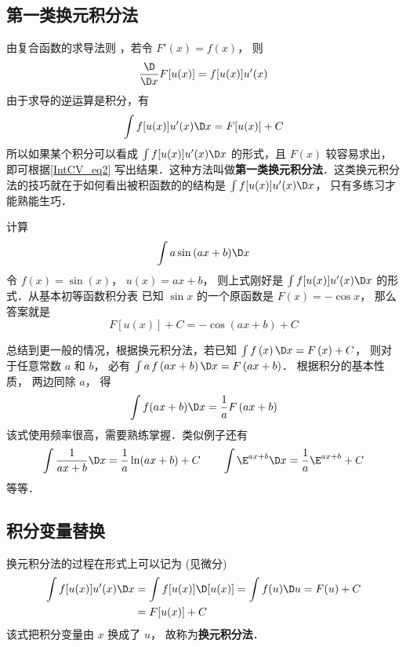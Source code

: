 
\subsection{第一类换元积分法}
由复合函数的求导法则%
，若令 $F'\left( x \right) = f\left( x \right)$， 则
\begin{equation}
\frac{\D}{\D x}	F[u(x)] = f[u(x)]u'(x)
\end{equation}
由于求导的逆运算是积分，有
\begin{equation}\label{IntCV_eq2}
\int f[u(x)]u'(x) \D x  = F[u(x)] + C
\end{equation}
所以如果某个积分可以看成 $\int f[u(x)]u'(x)\D x$ 的形式，且 $F(x)$ 较容易求出，即可根据\autoref{IntCV_eq2} 写出结果．这种方法叫做\textbf{第一类换元积分法}．这类换元积分法的技巧就在于如何看出被积函数的的结构是 $\int f[u(x)]u'(x)\D x$， 只有多练习才能熟能生巧． 

\begin{exam}{}
计算
\[\int {a\sin \left( {ax + b} \right)} \D x\]
令 $f\left( x \right) = \sin \left( x \right)$， $u\left( x \right) = ax + b$， 则上式刚好是 $\int f[u(x)]u'(x)\D x$ 的形式．从基本初等函数积分表 %
已知 $\sin x$ 的一个原函数是 $F(x) = -\cos x$， 那么答案就是
\begin{equation}
F[u(x)] + C =  - \cos \left( {ax + b} \right) + C
\end{equation}
\end{exam}

总结到更一般的情况，根据换元积分法，若已知 $\int {f\left( x \right)\D x}  = F\left( x \right) + C$， 则对于任意常数 $a$ 和 $b$， 必有 $\int {a\,f\left( {ax + b} \right)\D x}  = F\left( {ax + b} \right)$． 根据积分的基本性质，%
两边同除 $a$， 得
\begin{equation}
\int {f(ax + b) \D x}  = \frac{1}{a}F\left( {ax + b} \right)
\end{equation}
该式使用频率很高，需要熟练掌握．类似例子还有
\[ \int \frac{1}{ax+b}\D x = \frac{1}{a}\ln (ax + b)+C  \qquad
\int \E^{ax + b}\D x = \frac{1}{a}{\E^{ax + b}}+C \]
等等．

\subsection{积分变量替换}

换元积分法的过程在形式上可以记为 (见微分)
\begin{equation}\label{IntCV_eq1}
\begin{split}
\int f[u(x)]u'(x)\D x &= \int f[u(x)]\D [u(x)] = \int f(u)\D u = F(u)+C\\
&= F[u(x)]+C
\end{split}\end{equation}
该式把积分变量由 $x$ 换成了 $u$， 故称为\textbf{换元积分法}．

